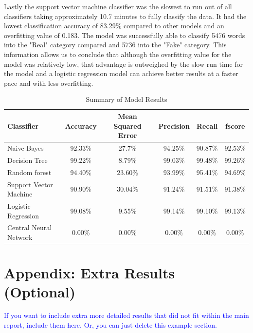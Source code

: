 \documentclass[10pt,twocolumn,letterpaper]{article}
\begin{document}
Lastly the support vector machine classifier was the slowest to run out of all classifiers taking approximately 10.7 minutes to fully classify the data. It had the lowest classification accuracy of 83.29\% compared to other models and an overfitting value of 0.183. The model was successfully able to classify 5476 words into the "Real" category compared and 5736 into the "Fake" category. This information allows us to conclude that although the overfitting value for the model was relatively low, that advantage is outweighed by the slow run time for the model and a logistic regression model can achieve better results at a faster pace and with less overfitting. 


\begin{table}[!hb]\centering
   \begin{center}
   \begin{tabular}{|l|c|c|c|c|c|}
   \hline
    Classifier & Accuracy & Mean Squared Error & Precision & Recall & fscore\\
   \hline\hline
   Naive Bayes & 92.33\% & 27.7\% & 94.25\% & 90.87\% & 92.53\% \\
   Decision Tree & 99.22\% & 8.79\% & 99.03\% & 99.48\% & 99.26\% \\
   Random forest & 94.40\% & 23.60\% & 93.99\% & 95.41\% & 94.69\%\\
   Support Vector Machine & 90.90\% & 30.04\% & 91.24\% & 91.51\% & 91.38\% \\
   Logistic Regression & 99.08\% & 9.55\% & 99.14\% & 99.10\% & 99.13\% \\
   Central Neural Network & 0.00\% & 0.00\% & 0.00\% & 0.00\% & 0.00\% \\
   \hline
   \end{tabular}
   \end{center}
   \caption{Summary of Model Results\label{first_table}}
\end{table}

{\small


}


\newpage
\appendix


\section*{Appendix: Extra Results (Optional)}

\textcolor{blue}{If you want to include extra more detailed results that did not fit within the main report, include them here. Or, you can just delete this example section.}
\end{document}
